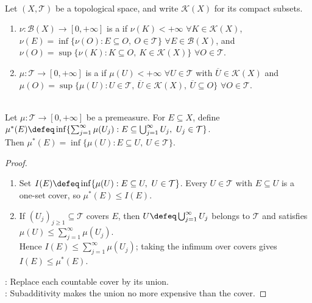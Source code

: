 \begin{definition} \label{def:radon-measure-and-radon-premeasure} \\
Let $(X,\mathcal{T})$ be a topological space, and write $\mathcal{K}(X)$ for its compact subsets.
\begin{enumerate}[label=(\roman*)]
\setlength{\itemsep}{0pt}
\item $\nu:\mathcal{B}(X)\to[0,+\infty]$ is a  if $\nu(K)<+\infty$ $\forall K\in\mathcal{K}(X)$, $\nu(E)=\inf\{\nu(O):E\subseteq O,\ O\in\mathcal{T}\}$ $\forall E\in\mathcal{B}(X)$, and $\nu(O)=\sup\{\nu(K):K\subseteq O,\ K\in\mathcal{K}(X)\}$ $\forall O\in\mathcal{T}$.
\item $\mu:\mathcal{T}\to[0,+\infty]$ is a  if $\mu(U)<+\infty$ $\forall U\in\mathcal{T}$ with $\overline{U}\in\mathcal{K}(X)$ and\\
$\mu(O)=\sup\{\mu(U):U\in\mathcal{T},\ \overline{U}\in\mathcal{K}(X),\ \overline{U}\subseteq O\}$ $\forall O\in\mathcal{T}$.
\end{enumerate}
\end{definition}

\begin{lemma} \label{lem:topological-premeasure-open-envelope} \\
Let $\mu:\mathcal{T}\to[0,+\infty]$ be a premeasure. For $E\subseteq X$, define $\mu^\ast(E)\defeq\inf\{\sum_{j=1}^{\infty}\mu(U_j):E\subseteq\bigcup_{j=1}^{\infty}U_j,\ U_j\in\mathcal{T}\}$.\\
Then $\mu^\ast(E)=\inf\{\mu(U):E\subseteq U,\ U\in\mathcal{T}\}$.
\begin{proof}
\begin{enumerate}[label=\roman*.]
\setlength{\itemsep}{0pt}
\item[$(\Rightarrow)$] Set $I(E)\defeq\inf\{\mu(U):E\subseteq U,\ U\in\mathcal{T}\}$. Every $U\in\mathcal{T}$ with $E\subseteq U$ is a one-set cover, so $\mu^\ast(E)\leq I(E)$.
\item[$(\Leftarrow)$] If $(U_j)_{j\geq1}\subseteq\mathcal{T}$ covers $E$, then $U\defeq\bigcup_{j=1}^{\infty}U_j$ belongs to $\mathcal{T}$ and satisfies $\mu(U)\leq\sum_{j=1}^{\infty}\mu(U_j)$.\\
Hence $I(E)\leq\sum_{j=1}^{\infty}\mu(U_j)$; taking the infimum over covers gives $I(E)\leq\mu^\ast(E)$.
\end{enumerate}
: Replace each countable cover by its union.\\
: Subadditivity makes the union no more expensive than the cover.
\end{proof}
\end{lemma}

